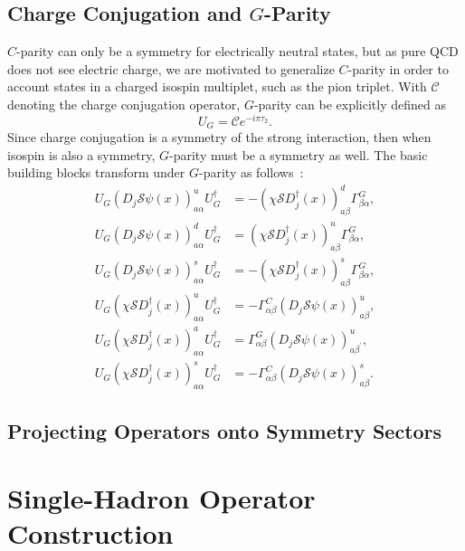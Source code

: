     \subsection{Charge Conjugation and $G$-Parity}
    $C$-parity can only be a symmetry for electrically neutral states, but as pure QCD does not see electric charge, we are motivated to generalize $C$-parity in order to account states in a charged isospin multiplet, such as the pion triplet. With $\mathcal C$ denoting the charge conjugation operator, $G$-parity can be explicitly defined as
    \begin{equation}
        U_G = \mathcal C e^{-i\pi\tau_2}.
    \end{equation}
    Since charge conjugation is a symmetry of the strong interaction, then when isospin is also a symmetry, $G$-parity must be a symmetry as well. The basic building blocks transform under $G$-parity as follows~\cite{ref:spectroscopy}:
    \begin{align} U_{G}\left(D_{j} \mathcal S \psi(x)\right)_{a \alpha}^{u} U_{G}^{\dagger} &=-\left(\chi \mathcal S D_{j}^{\dagger}(x)\right)_{a \beta}^{d} \Gamma_{\beta \alpha}^{G}, \\ U_{G}\left(D_{j}\mathcal S \psi(x)\right)_{a \alpha}^{d} U_{G}^{\dagger} &=\left(\chi \mathcal S D_{j}^{\dagger}(x)\right)_{a \beta}^{u} \Gamma_{\beta \alpha}^{G}, \\ U_{G}\left(D_{j} \mathcal S \psi(x)\right)_{a \alpha}^{s} U_{G}^{\dagger} &=-\left(\chi \mathcal S D_{j}^{\dagger}(x)\right)_{a \beta}^{s} \Gamma_{\beta \alpha}^{G}, \\ U_{G}\left(\chi \mathcal S D_{j}^{\dagger}(x)\right)_{a \alpha}^{u} U_{G}^{\dagger} &=-\Gamma_{\alpha \beta}^{C}\left(D_{j} \mathcal S \psi(x)\right)_{a \beta}^{u}, \\ U_{G}\left(\chi \mathcal S D_{j}^{\dagger}(x)\right)_{a \alpha}^{a} U_{G}^{\dagger} &=\Gamma_{\alpha \beta}^{G}\left(D_{j} \mathcal S \psi(x)\right)_{a \beta^{\prime}}^{u}, \\ U_{G}\left(\chi \mathcal S D_{j}^{\dagger}(x)\right)_{a \alpha}^{s} U_{G}^{\dagger} &=-\Gamma_{\alpha \beta}^{C}\left(D_{j} \mathcal S \psi(x)\right)_{a \beta}^{s}. \end{align}
    \subsection{Projecting Operators onto Symmetry Sectors}

    \section{Single-Hadron Operator Construction}
